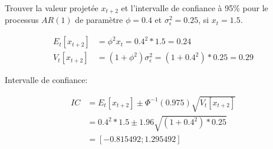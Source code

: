 \begin{exercice}
  Trouver la valeur projetée $x_{t+2}$ et l'intervalle de confiance à 95\% pour le processus $AR(1)$ de paramètre $\phi=0.4$ et $\sigma^2_{\epsilon}=0.25$, si $x_t=1.5$.
  \begin{sol}
    \begin{align*}
  E_t[x_{t+2}] &= \phi^2 x_t = 0.4^2*1.5 = 0.24 \\
  V_t[x_{t+2}] &= (1+\phi^2)\sigma^2_{\epsilon} = (1+0.4^2)*0.25 = 0.29
\end{align*}

Intervalle de confiance:

\begin{align*}
  IC &= E_t[x_{t+2}] \pm \Phi^{-1}(0.975)\sqrt{V_t[x_{t+2}]} \\
  &= 0.4^2*1.5 \pm 1.96 \sqrt{(1+0.4^2)*0.25} \\
  &= [-0.815492;1.295492]
\end{align*}
  \end{sol}
\end{exercice}


